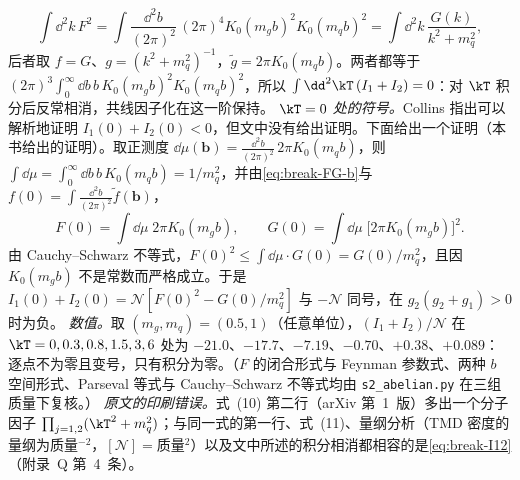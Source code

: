 \begin{example}
\[
\int\dd^2k\,F^2=\int\frac{\dd^2b}{(2\pi)^2}\,(2\pi)^4K_0(m_gb)^2K_0(m_qb)^2=\int\dd^2k\,\frac{G(k)}{k^2+m_q^2},
\]
后者取 $f=G$、$g=(k^2+m_q^2)^{-1}$，$\tilde g=2\pi K_0(m_qb)$。两者都等于 $(2\pi)^3\int_0^\infty\dd b\,b\,K_0(m_gb)^2K_0(m_qb)^2$，所以 $\int\dd^2\kT\,(I_1+I_2)=0$：对 $\kT$ 积分后反常相消，共线因子化在这一阶保持。
\emph{$\kT=0$ 处的符号。}Collins 指出可以解析地证明 $I_1(0)+I_2(0)<0$，但文中没有给出证明\cite{Collins2007}。下面给出一个证明（本书给出的证明）。取正测度 $\dd\mu(\boldsymbol b)=\frac{\dd^2b}{(2\pi)^2}\,2\pi K_0(m_qb)$，则 $\int\dd\mu=\int_0^\infty\dd b\,b\,K_0(m_qb)=1/m_q^2$，并由\cref{eq:break-FG-b}与 $f(0)=\int\frac{\dd^2b}{(2\pi)^2}\tilde f(\boldsymbol b)$，
\[
F(0)=\int\dd\mu\;2\pi K_0(m_gb),\qquad G(0)=\int\dd\mu\;\big[2\pi K_0(m_gb)\big]^2 .
\]
由 Cauchy--Schwarz 不等式，$F(0)^2\le\int\dd\mu\cdot G(0)=G(0)/m_q^2$，且因 $K_0(m_gb)$ 不是常数而严格成立。于是 $I_1(0)+I_2(0)=\mathcal N[F(0)^2-G(0)/m_q^2]$ 与 $-\mathcal N$ 同号，在 $g_2(g_2+g_1)>0$ 时为负。
\emph{数值。}取 $(m_g,m_q)=(0.5,1)$（任意单位），$(I_1+I_2)/\mathcal N$ 在 $\kT=0,0.3,0.8,1.5,3,6$ 处为 $-21.0$、$-17.7$、$-7.19$、$-0.70$、$+0.38$、$+0.089$：逐点不为零且变号，只有积分为零。（$F$ 的闭合形式与 Feynman 参数式、两种 $b$ 空间形式、Parseval 等式与 Cauchy--Schwarz 不等式均由 \texttt{s2\_abelian.py} 在三组质量下复核。）
\emph{原文的印刷错误。}\cite{Collins2007}式~(10) 第二行（arXiv 第~1~版）多出一个分子因子 $\prod_{j=1,2}(\kT^2+m_q^2)$；与同一式的第一行、式~(11)、量纲分析（TMD 密度的量纲为质量$^{-2}$，$[\mathcal N]=$质量$^2$）以及文中所述的积分相消都相容的是\cref{eq:break-I12}（附录~Q 第~4~条）。
\end{example}
